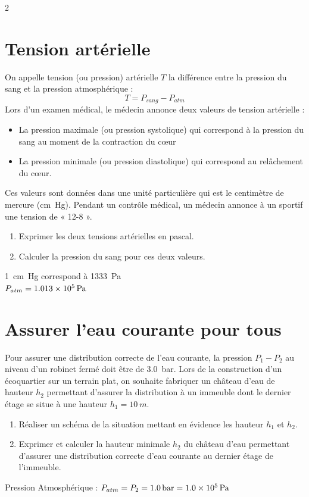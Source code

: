 \documentclass[a4paper,11pt,fleqn]{article}%
\begin{document}
\begin{multicols}{2}
\section{Tension artérielle}
On appelle tension (ou pression) artérielle $T$ la différence entre la pression du sang et la pression atmosphérique :
$$T = P_{sang}-P_{atm}$$
Lors d’un examen médical, le médecin annonce deux valeurs de tension artérielle :
\begin{itemize}
	\item La pression maximale (ou pression systolique) qui correspond à la pression du sang au moment de la
	contraction du cœur
	\item La pression minimale (ou pression diastolique) qui correspond au relâchement du cœur.
\end{itemize}
Ces valeurs sont données dans une unité particulière qui est le centimètre de mercure (\unit{cm~Hg}).
Pendant un contrôle médical, un médecin annonce à un sportif une tension de « 12-8 ».
\begin{enumerate}
	\item Exprimer les deux tensions artérielles en pascal.
	\item Calculer la pression du sang  pour ces deux valeurs.
\end{enumerate}
\begin{data}
	\SI{1}{cm~Hg} correspond à \SI{1333}{\pascal}\\
	$P_{atm} = \SI{1,013E5}{\pascal}$
\end{data}



\section{Assurer l'eau courante pour tous}
Pour assurer une distribution correcte de l'eau courante, la pression $P_1-P_2$ au niveau d'un robinet fermé doit être de \SI{3,0}{\bar}. Lors de la construction d'un écoquartier sur un terrain plat, on souhaite fabriquer un château d'eau de hauteur $h_2$ permettant d'assurer la distribution à un immeuble dont le dernier étage se situe à une hauteur $h_1 = \SI{10}{m}$.
\begin{enumerate}
	\item Réaliser un schéma de la situation mettant en évidence les hauteur $h_1$ et $h_2$.
	\item Exprimer et calculer la hauteur minimale $h_2$ du château d'eau permettant d'assurer une distribution correcte d'eau courante au dernier étage de l'immeuble.
\end{enumerate}
\begin{data}
	Pression Atmosphérique : $P_{atm} = P_2 = \SI{1,0}{\bar} = \SI{1,0E5}{\pascal}$
\end{data}

\end{multicols}
\end{document}
